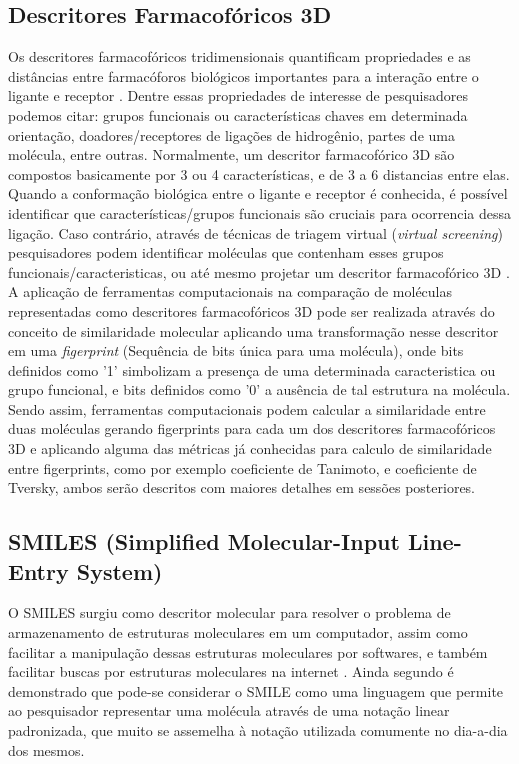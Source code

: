 \subsection{Descritores Farmacofóricos 3D}
Os descritores farmacofóricos tridimensionais quantificam propriedades e as distâncias entre  farmacóforos biológicos importantes para a interação entre o ligante e receptor  \cite{bajorath2004chemoinformatics}. Dentre essas propriedades de interesse de pesquisadores podemos citar: grupos funcionais ou características chaves em determinada orientação, doadores/receptores de ligações de hidrogênio, partes de uma molécula, entre outras. Normalmente, um descritor farmacofórico 3D são compostos basicamente por 3 ou 4 características, e de 3 a 6 distancias entre elas. 
Quando a conformação biológica entre o ligante e receptor é conhecida, é possível identificar     
que características/grupos funcionais são cruciais para ocorrencia dessa ligação. Caso contrário, através de técnicas de triagem virtual (\textit{virtual screening}) pesquisadores podem identificar moléculas que contenham esses grupos funcionais/caracteristicas, ou até mesmo projetar um descritor farmacofórico 3D \cite{bajorath2004chemoinformatics}. 
A aplicação de ferramentas computacionais na comparação de moléculas representadas como descritores farmacofóricos 3D pode ser realizada através do conceito de similaridade molecular aplicando uma transformação nesse descritor em uma \textit{figerprint} (Sequência de bits única para uma molécula), onde bits definidos como '1' simbolizam a presença de uma determinada caracteristica ou grupo funcional, e bits definidos como '0' a ausência de tal estrutura na molécula. Sendo assim, ferramentas computacionais podem calcular a similaridade entre duas moléculas gerando figerprints para cada um dos descritores farmacofóricos 3D e aplicando alguma das métricas já conhecidas para calculo de similaridade entre figerprints, como por exemplo coeficiente de Tanimoto, e coeficiente de Tversky, ambos serão descritos com maiores detalhes em sessões posteriores.          

\subsection{SMILES (Simplified Molecular-Input Line-Entry System)}
     
O SMILES surgiu como descritor molecular para resolver o problema de 
armazenamento de estruturas moleculares em um computador, assim como facilitar a 
manipulação dessas estruturas moleculares por softwares, e também facilitar buscas por 
estruturas moleculares na internet \cite{kumar2012}. Ainda segundo \cite{kumar2012} é demonstrado que pode-se considerar o SMILE como uma linguagem que permite ao 
pesquisador representar uma molécula através de uma notação linear padronizada, que muito 
se assemelha à notação utilizada comumente no dia-a-dia dos mesmos.

